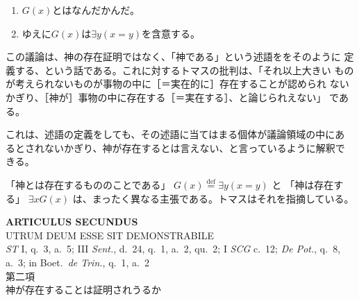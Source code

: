 \documentclass[10pt]{jsarticle}
\begin{document}
\begin{enumerate}
 \item $G(x)$とはなんだかんだ。
 \item ゆえに$G(x)$は$\exists y(x=y)$を含意する。
\end{enumerate}



この議論は、神の存在証明ではなく、「神である」という述語ををそのように
定義する、という話である。これに対するトマスの批判は、「それ以上大きい
ものが考えられないものが事物の中に［＝実在的に］存在することが認められ
ないかぎり、［神が］事物の中に存在する［＝実在する］、と論じられえない」
である。

これは、述語の定義をしても、その述語に当てはまる個体が議論領域の中にあ
るとされないかぎり、神が存在するとは言えない、と言っているように解釈で
きる。

「神とは存在するもののことである」
$G(x) \overset{\mathrm{def}}{=} \exists y(x=y)$
と
「神は存在する」
$\exists xG(x)$
は、まったく異なる主張である。トマスはそれを指摘している。
 

\newpage
{}
\begin{center}
 {\Large {\bf ARTICULUS SECUNDUS}}\\
 {\large UTRUM DEUM ESSE SIT DEMONSTRABILE}\\
 {\footnotesize {\it ST} I, q.~3, a.~5; III {\it Sent.}, d.~24, q.~1,
 a.~2, qu.~2; I {\it SCG} c.~12; {\it De Pot.}, q.~8, a.~3; in
 Boet.~{\it de Trin.}, q.~1, a.~2}\\
 {\Large 第二項\\神が存在することは証明されうるか}
\end{center}
\end{document}
